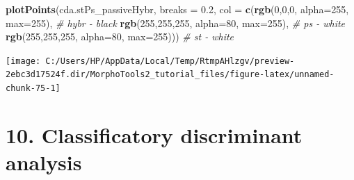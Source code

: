 \documentclass[
]{article}
\newenvironment{Shaded}{\begin{snugshade}}{\end{snugshade}}
\newcommand{\CommentTok}[1]{\textcolor[rgb]{0.56,0.35,0.01}{\textit{#1}}}
\newcommand{\DataTypeTok}[1]{\textcolor[rgb]{0.13,0.29,0.53}{#1}}
\newcommand{\DecValTok}[1]{\textcolor[rgb]{0.00,0.00,0.81}{#1}}
\newcommand{\FloatTok}[1]{\textcolor[rgb]{0.00,0.00,0.81}{#1}}
\newcommand{\KeywordTok}[1]{\textcolor[rgb]{0.13,0.29,0.53}{\textbf{#1}}}
\newcommand{\NormalTok}[1]{#1}
\begin{document}
\begin{Shaded}
\begin{Highlighting}[]
\KeywordTok{plotPoints}\NormalTok{(cda.stPs_passiveHybr, }\DataTypeTok{breaks =} \FloatTok{0.2}\NormalTok{,}
                \DataTypeTok{col =} \KeywordTok{c}\NormalTok{(}\KeywordTok{rgb}\NormalTok{(}\DecValTok{0}\NormalTok{,}\DecValTok{0}\NormalTok{,}\DecValTok{0}\NormalTok{, }\DataTypeTok{alpha=}\DecValTok{255}\NormalTok{, }\DataTypeTok{max=}\DecValTok{255}\NormalTok{), }\CommentTok{# hybr - black}
                        \KeywordTok{rgb}\NormalTok{(}\DecValTok{255}\NormalTok{,}\DecValTok{255}\NormalTok{,}\DecValTok{255}\NormalTok{, }\DataTypeTok{alpha=}\DecValTok{80}\NormalTok{, }\DataTypeTok{max=}\DecValTok{255}\NormalTok{), }\CommentTok{# ps - white}
                        \KeywordTok{rgb}\NormalTok{(}\DecValTok{255}\NormalTok{,}\DecValTok{255}\NormalTok{,}\DecValTok{255}\NormalTok{, }\DataTypeTok{alpha=}\DecValTok{80}\NormalTok{, }\DataTypeTok{max=}\DecValTok{255}\NormalTok{))) }\CommentTok{# st - white }
\end{Highlighting}
\end{Shaded}

\begin{center}\texttt{[image: C:/Users/HP/AppData/Local/Temp/RtmpAHlzgv/preview-2ebc3d17524f.dir/MorphoTools2\_tutorial\_files/figure-latex/unnamed-chunk-75-1]} \end{center}

\hypertarget{classificatory-discriminant-analysis}{%
\section{10. Classificatory discriminant
analysis}\label{classificatory-discriminant-analysis}}
\end{document}
